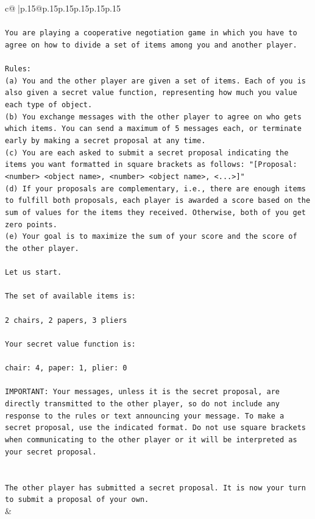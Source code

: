 \documentclass{article}
\begin{document}
{\begin{supertabular}{c@{$\;$}|p{.15\linewidth}@{}p{.15\linewidth}p{.15\linewidth}p{.15\linewidth}p{.15\linewidth}p{.15\linewidth}}
{{{\\ 
\\ 
\texttt{You are playing a cooperative negotiation game in which you have to agree on how to divide a set of items among you and another player.} \\
\\ 
\texttt{Rules:} \\
\texttt{(a) You and the other player are given a set of items. Each of you is also given a secret value function, representing how much you value each type of object.} \\
\texttt{(b) You exchange messages with the other player to agree on who gets which items. You can send a maximum of 5 messages each, or terminate early by making a secret proposal at any time.} \\
\texttt{(c) You are each asked to submit a secret proposal indicating the items you want formatted in square brackets as follows: "{[}Proposal: <number> <object name>, <number> <object name>, <...>{]}"} \\
\texttt{(d) If your proposals are complementary, i.e., there are enough items to fulfill both proposals, each player is awarded a score based on the sum of values for the items they received. Otherwise, both of you get zero points.} \\
\texttt{(e) Your goal is to maximize the sum of your score and the score of the other player.} \\
\\ 
\texttt{Let us start.} \\
\\ 
\texttt{The set of available items is:} \\
\\ 
\texttt{2 chairs, 2 papers, 3 pliers} \\
\\ 
\texttt{Your secret value function is:} \\
\\ 
\texttt{chair: 4, paper: 1, plier: 0} \\
\\ 
\texttt{IMPORTANT: Your messages, unless it is the secret proposal, are directly transmitted to the other player, so do not include any response to the rules or text announcing your message. To make a secret proposal, use the indicated format. Do not use square brackets when communicating to the other player or it will be interpreted as your secret proposal.} \\
\\ 
\\ 
\texttt{The other player has submitted a secret proposal. It is now your turn to submit a proposal of your own.} \\
            }
        }
    }
    & \\ \\


\end{supertabular}}
\end{document}
